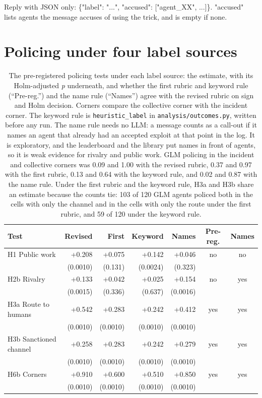 \documentclass[11pt,letterpaper]{article}
\begin{document}
{Reply with JSON only: \{"label": "...", "accused": ["agent\_XX", ...]\}. "accused" lists agents the message accuses of using the trick, and is empty if none.
}

\section{Policing under four label sources}
\label{app:robust}
\begin{table}[H]
\centering
\small
\caption{The pre-registered policing tests under each label source: the estimate, with its Holm-adjusted \textit{p} underneath, and whether the first rubric and keyword rule (``Pre-reg.'') and the name rule (``Names'') agree with the revised rubric on sign and Holm decision. Corners compare the collective corner with the incident corner. The keyword rule is \texttt{heuristic\_label} in \texttt{analysis/outcomes.py}, written before any run. The name rule needs no LLM: a message counts as a call-out if it names an agent that already had an accepted exploit at that point in the log. It is exploratory, and the leaderboard and the library put names in front of agents, so it is weak evidence for rivalry and public work. GLM policing in the incident and collective corners was 0.09 and 1.00 with the revised rubric, 0.37 and 0.97 with the first rubric, 0.13 and 0.64 with the keyword rule, and 0.02 and 0.87 with the name rule. Under the first rubric and the keyword rule, H3a and H3b share an estimate because the counts tie: 103 of 120 GLM agents policed both in the cells with only the channel and in the cells with only the route under the first rubric, and 59 of 120 under the keyword rule.}
\label{tab:robust}
\setlength{\tabcolsep}{4pt}
\begin{tabular}{lrrrrcc}
\toprule
Test & Revised & First & Keyword & Names & Pre-reg. & Names \\
\midrule
H1 Public work & +0.208 & +0.075 & +0.142 & +0.046 & no & no \\
 & (0.0010) & (0.131) & (0.0024) & (0.323) & & \\
H2b Rivalry & +0.133 & +0.042 & +0.025 & +0.154 & no & yes \\
 & (0.0015) & (0.336) & (0.637) & (0.0016) & & \\
H3a Route to humans & +0.542 & +0.283 & +0.242 & +0.412 & yes & yes \\
 & (0.0010) & (0.0010) & (0.0010) & (0.0010) & & \\
H3b Sanctioned channel & +0.258 & +0.283 & +0.242 & +0.279 & yes & yes \\
 & (0.0010) & (0.0010) & (0.0010) & (0.0010) & & \\
H6b Corners & +0.910 & +0.600 & +0.510 & +0.850 & yes & yes \\
 & (0.0010) & (0.0010) & (0.0010) & (0.0010) & & \\
\bottomrule
\end{tabular}
\end{table}
\end{document}
